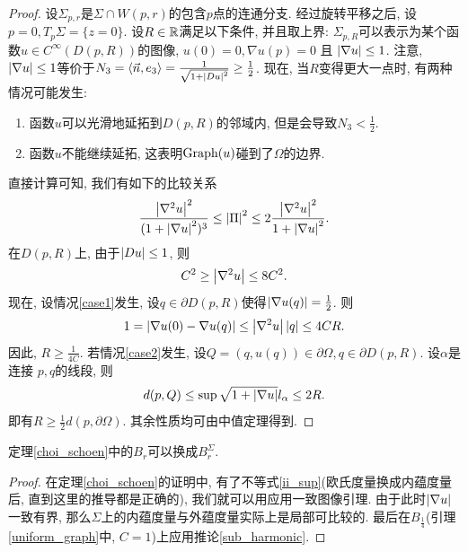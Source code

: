 \begin{proof}
    设$\Sigma_{p,r}$是$\Sigma \cap W(p,r)$的包含$p$点的连通分支.  经过旋转平移之后, 设$p =0, T_p\Sigma = \{z=0\}$. 设$R \in \mathbb{R}$满足以下条件, 并且取上界: $\Sigma_{p,R}$可以表示为某个函数$u \in C^\infty(D(p,R))$的图像, $u(0)=0, \nabla u(p)=0$ 且 $\left | \nabla u \right | \le 1$. 注意, $\left | \nabla u \right | \le 1$等价于$N_3={\left < \vec{n}, e_3 \right >}=\frac{1}{\sqrt{1+\left | Du \right |^2}} \ge \frac{1}{2}$. 现在, 当$R$变得更大一点时, 有两种情况可能发生:
    \begin{enumerate}
        \item 函数$u$可以光滑地延拓到$D(p,R)$的邻域内, 但是会导致$N_3< \frac{1}{2}$. \label{case1}
        \item 函数$u$不能继续延拓, 这表明$\text{Graph}(u)$碰到了$\Omega$的边界. \label{case2}
    \end{enumerate}
    直接计算可知, 我们有如下的比较关系
    \begin{equation}
        \frac{\left | \nabla^2 u \right |^2}{(1+\left | \nabla u \right |^2)^3} \le \left | {\Pi} \right |^2 \le 2 \frac{\left | \nabla^2 u \right |^2}{1+\left | \nabla u \right |^2}.
    \end{equation}
    在$D(p,R)$上, 由于$\left | Du \right | \le 1$, 则
    \begin{equation}
        C^2 \ge \left | \nabla^2 u \right | \le 8C^2.
    \end{equation}
    现在, 设情况\eqref{case1}发生, 设$q \in \partial D(p,R)$使得$\left | \nabla u(q) \right |=\frac{1}{2}$. 则
    \begin{equation}
        1=\left | \nabla u(0)-\nabla u(q) \right | \le \left | \nabla^2 u \right |\left | q \right |\le 4CR.
    \end{equation}
    因此, $R \ge \frac{1}{4C}$.
    若情况\eqref{case2}发生,  设$Q=(q,u(q))\in \partial \Omega, q \in \partial D(p,R)$. 设$\alpha$是连接 $p,q$的线段, 则
    \begin{equation}
        d(p,Q) \le \sup \sqrt{1+\left | \nabla u \right |}l_\alpha \le 2R.
    \end{equation}
    即有$R \ge \frac{1}{2}{d(p,\partial \Omega)}$.  其余性质均可由中值定理得到.
\end{proof}
\begin{corollary} \label{choi_schoen_intrinsic}
    定理\eqref{choi_schoen}中的$B_r$可以换成$B^\Sigma_r$.
\end{corollary}
\begin{proof}
    在定理\eqref{choi_schoen}的证明中, 有了不等式\eqref{ii_sup}(欧氏度量换成内蕴度量后, 直到这里的推导都是正确的), 我们就可以用应用一致图像引理. 由于此时$\left | \nabla u \right |$一致有界, 那么$\Sigma$上的内蕴度量与外蕴度量实际上是局部可比较的. 最后在$B_\frac{1}{4}$(引理\eqref{uniform_graph}中, $C=1$)上应用推论\eqref{sub_harmonic}.
\end{proof}
